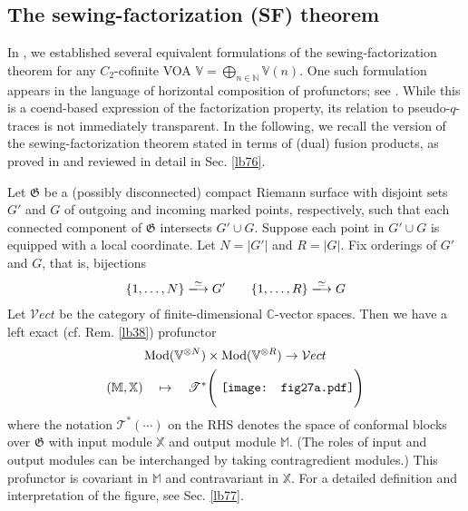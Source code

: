 \documentclass[11pt,b5paper,notitlepage]{article}
\theoremstyle{definition}
\theoremstyle{plain}
\newcommand{\Vect}{\mathcal Vect}
\newcommand{\Vbb}{\mathbb V}
\newcommand{\Xbb}{\mathbb X}
\newcommand{\Mbb}{\mathbb M}
\newcommand{\Cbb}{\mathbb C}
\newcommand{\Nbb}{\mathbb N}
\newcommand{\<}{\left\langle}
\renewcommand{\>}{\right\rangle}
\newcommand{\ST}{\mathscr{T}}
\newcommand{\Mod}{\mathrm{Mod}}
\newcommand{\fg}{\mathfrak{G}}
\numberwithin{equation}{section}
\begin{document}
\subsection{The sewing-factorization (SF) theorem}


In \cite{GZ3}, we established several equivalent formulations of the sewing-factorization theorem for any $C_2$-cofinite VOA $\Vbb=\bigoplus_{n\in\Nbb}\Vbb(n)$. One such formulation appears in the language of horizontal composition of profunctors; see \cite[Sec. 3.2]{GZ3}. While this is a coend-based expression of the factorization property, its relation to pseudo-$q$-traces is not immediately transparent. In the following, we recall the version of the sewing-factorization theorem stated in terms of (dual) fusion products, as proved in \cite[Sec. 3.1]{GZ3} and reviewed in detail in Sec. \ref{lb76}.

Let $\fg$ be a (possibly disconnected) compact Riemann surface with disjoint sets $G'$ and $G$ of outgoing and incoming marked points, respectively, such that each connected component of $\fg$ intersects $G'\cup G$. Suppose each point in $G'\cup G$ is equipped with a local coordinate. Let $N = |G'|$ and $R = |G|$. Fix orderings of $G'$ and $G$, that is, bijections
\begin{align*}
\{1,\dots,N\}\xlongrightarrow{\simeq}G'\qquad \{1,\dots,R\}\xlongrightarrow{\simeq}G
\end{align*}
Let $\Vect$ be the category of finite-dimensional $\Cbb$-vector spaces. Then we have a left exact (cf. Rem. \ref{lb38}) profunctor
\begin{gather*}
\Mod(\Vbb^{\otimes N})\times\Mod(\Vbb^{\otimes R})\rightarrow\Vect\\
(\Mbb,\Xbb)\quad\mapsto\quad\ST^*\Bigg(\vcenter{\hbox{{
		\texttt{[image: fig27a.pdf]}}}}\Bigg)
\end{gather*}
where the notation $\ST^*(\cdots)$ on the RHS denotes the space of conformal blocks over $\fg$ with input module $\Xbb$ and output module $\Mbb$. (The roles of input and output modules can be interchanged by taking contragredient modules.) This profunctor is covariant in $\Mbb$ and contravariant in $\Xbb$. For a detailed definition and interpretation of the figure, see Sec. \ref{lb77}.
\end{document}
